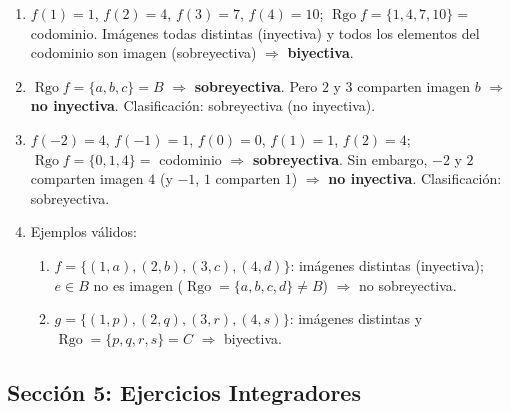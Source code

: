 \documentclass[12pt, letterpaper]{article}
\newcommand{\Rgo}{\operatorname{Rgo}}
\begin{document}
  \begin{enumerate}[leftmargin=*, label=\textbf{\arabic*.}]
    \item $f(1) = 1$, $f(2) = 4$, $f(3) = 7$, $f(4) = 10$; $\Rgo f = \{1,4,7,10\} = $ codominio.
          Imágenes todas distintas (inyectiva) y todos los elementos del codominio son imagen (sobreyectiva) $\Rightarrow$ \textbf{biyectiva}.

    \item $\Rgo f = \{a,b,c\} = B$ $\Rightarrow$ \textbf{sobreyectiva}. Pero $2$ y $3$ comparten imagen $b$ $\Rightarrow$ \textbf{no inyectiva}.
          Clasificación: sobreyectiva (no inyectiva).

    \item $f(-2) = 4$, $f(-1) = 1$, $f(0) = 0$, $f(1) = 1$, $f(2) = 4$; $\Rgo f = \{0,1,4\} = $ codominio $\Rightarrow$ \textbf{sobreyectiva}.
          Sin embargo, $-2$ y $2$ comparten imagen $4$ (y $-1$, $1$ comparten $1$) $\Rightarrow$ \textbf{no inyectiva}. Clasificación: sobreyectiva.

    \item Ejemplos válidos:
          \begin{enumerate}[label=\alph*)]
            \item $f = \{(1,a), (2,b), (3,c), (4,d)\}$: imágenes distintas (inyectiva); $e \in B$ no es imagen ($\Rgo = \{a,b,c,d\} \neq B$) $\Rightarrow$ no sobreyectiva.
            \item $g = \{(1,p), (2,q), (3,r), (4,s)\}$: imágenes distintas y $\Rgo = \{p,q,r,s\} = C$ $\Rightarrow$ biyectiva.
          \end{enumerate}
  \end{enumerate}

  \newpage

  \subsection*{Sección 5: Ejercicios Integradores}
\end{document}
